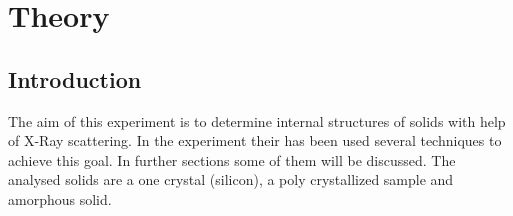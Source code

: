 
\section{Theory}

\subsection{Introduction}
The aim of this experiment is to determine internal structures of solids with help of X-Ray scattering. In the experiment their has been used several techniques to achieve this goal. In further sections some of them will be discussed. The analysed solids are a one crystal (silicon), a poly crystallized sample and amorphous solid.
	
